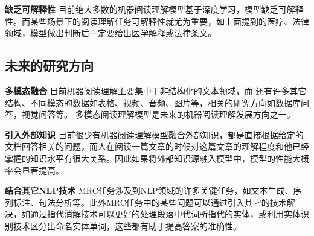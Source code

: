 \textbf{缺乏可解释性} \quad
目前绝大多数的机器阅读理解模型基于深度学习，模型缺乏可解释性。而某些场景下的阅读理解任务可解释性就尤为重要，如上面提到的医疗、法律领域，模型做出判断后一定要给出医学解释或法律条文。

\subsection{未来的研究方向}




\textbf{多模态融合} \quad 
目前机器阅读理解主要集中于非结构化的文本领域，而
还有许多其它结构、不同模态的数据如表格、视频、音频、图片等，相关的研究方向如数据库问答，视觉问答等。
多模态阅读理解模型是未来的机器阅读理解发展方向之一。


\textbf{引入外部知识} \quad
目前很少有机器阅读理解模型融合外部知识，都是直接根据给定的文档回答相关的问题，而人在阅读一篇文章的时候对这篇文章的理解程度和他已经掌握的知识水平有很大关系。因此如果将外部知识源融入模型中，模型的性能大概率会显著提高。

\textbf{结合其它NLP技术} \quad
MRC任务涉及到NLP领域的许多关键任务，如文本生成、序列标注、句法分析等。此外MRC任务中的某些问题可以通过引入其它的技术解决，如通过指代消解技术可以更好的处理段落中代词所指代的实体，或利用实体识别技术区分出命名实体单词，这些都有助于提高答案的准确性。




















